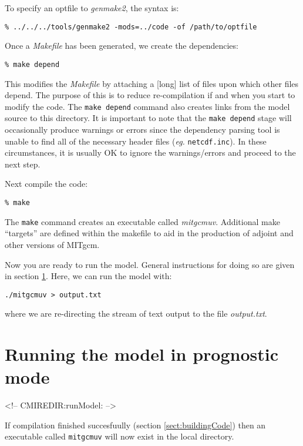To specify an optfile to {\em genmake2}, the syntax is:
\begin{verbatim}
% ../../../tools/genmake2 -mods=../code -of /path/to/optfile
\end{verbatim}

Once a {\em Makefile} has been generated, we create the dependencies:
\begin{verbatim}
% make depend
\end{verbatim}
This modifies the {\em Makefile} by attaching a [long] list of files
upon which other files depend. The purpose of this is to reduce
re-compilation if and when you start to modify the code. The {\tt make
  depend} command also creates links from the model source to this
directory.  It is important to note that the {\tt make depend} stage
will occasionally produce warnings or errors since the dependency
parsing tool is unable to find all of the necessary header files
(\textit{eg.}  \texttt{netcdf.inc}).  In these circumstances, it is
usually OK to ignore the warnings/errors and proceed to the next step.

Next compile the code:
\begin{verbatim}
% make
\end{verbatim}
The {\tt make} command creates an executable called \textit{mitgcmuv}.
Additional make ``targets'' are defined within the makefile to aid in
the production of adjoint and other versions of MITgcm.

Now you are ready to run the model. General instructions for doing so are
given in section \ref{sect:runModel}. Here, we can run the model with:
\begin{verbatim}
./mitgcmuv > output.txt
\end{verbatim}
where we are re-directing the stream of text output to the file {\em
output.txt}.


\section[Running MITgcm]{Running the model in prognostic mode}
\label{sect:runModel}
\begin{rawhtml}
<!-- CMIREDIR:runModel: -->
\end{rawhtml}

If compilation finished succesfuully (section \ref{sect:buildingCode})
then an executable called \texttt{mitgcmuv} will now exist in the
local directory.

